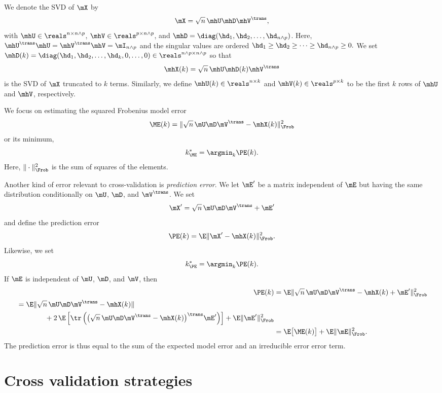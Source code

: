 We denote the SVD of $\mX$ by
\[
    \mX = \sqrt{n} \, \mhU \mhD \mhV^\trans, 
\]
with $\mhU \in \reals^{n \times n \wedge p}$, $\mhV \in \reals^{p \times n
\wedge p}$, and $\mhD = \diag( \hd_1, \hd_2, \ldots, \hd_{n \wedge p})$. Here,
$\mhU^\trans \mhU = \mhV^\trans \mhV = \mI_{n \wedge p}$ and the singular
values are ordered
\(
    \hd_1 \geq \hd_2 \geq \cdots \geq \hd_{n \wedge p} \geq 0.
\)
We set $\mhD(k) = \diag( \hd_1, \hd_2, \ldots, \hd_k, 0, \ldots, 0) \in \reals^{n \wedge p \times n \wedge p}$ so that
\[
    \mhX(k) = \sqrt{n} \, \mhU \mhD(k) \mhV^\trans
\]
is the SVD of $\mX$ truncated to $k$ terms.  Similarly, we define $\mhU(k) \in 
\reals^{n \times k}$ and $\mhV(k) \in \reals^{p \times k}$ to be the first $k$ 
rows of $\mhU$ and $\mhV$, respectively.

We focus on estimating the squared Frobenius model error
\[
    \ME(k) = \| \sqrt{n} \, \mU \mD \mV^\trans - \mhX(k) \|_\Frob^2
\]
or its minimum,
\[
    k^\ast_{\ME} = \argmin_k \PE(k).
\]  
Here, $\| \cdot \|_\Frob^2$ is the sum of squares of the elements.

Another kind of error relevant to cross-validation is \emph{prediction error}.  We let $\mE'$ be a matrix independent of $\mE$ but having the same distribution conditionally on $\mU$, $\mD$, and $\mV^\trans$.  We set 
\[
    \mX' = \sqrt{n} \, \mU \mD \mV^\trans + \mE'
\]
and define the prediction error
\[
    \PE(k) = \E \| \mX' - \mhX(k) \|_\Frob^2.
\]
Likewise, we set
\[
    k^\ast_{\PE} = \argmin_k \PE(k).
\]
If $\mE$ is independent of $\mU$, $\mD$, and $\mV$, then
\begin{align*}
    \PE(k) 
        &= \E\| \sqrt{n} \, \mU \mD \mV^\trans - \mhX(k) + \mE' \|_\Frob^2 \\
    \begin{split}
        &= \E\| \sqrt{n} \, \mU \mD \mV^\trans - \mhX(k) \| \\
           &\qquad\qquad+ 
           2 \, 
           \E \left[
               \tr \left( 
                   \big( \sqrt{n} \, \mU \mD \mV^\trans - \mhX(k) \big)^\trans 
                   \mE'
               \right)
           \right]
           +
           \E\| \mE' \|_\Frob^2 
    \end{split} \\
        &= \E\big[\ME(k)\big] + \E \| \mE \|_\Frob^2.
\end{align*}
The prediction error is thus equal to the sum of the expected model error
and an irreducible error error term.


\section{Cross validation strategies}

